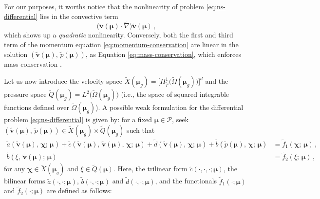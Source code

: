 \documentclass[12pt, a4paper, twoside, openright]{report}
\numberwithin{equation}{chapter}
\theoremstyle{theorem}
\theoremstyle{definition}
\theoremstyle{remark}
\theoremstyle{proposition}
\numberwithin{figure}{chapter}
\newcommand{\wt}[1]{\widetilde{#1}}
\newcommand{\bg}[1]{\boldsymbol{#1}}
\begin{document}
		For our purposes, it worths notice that the nonlinearity of problem \eqref{eq:ns-differential} lies in the convective term
		\begin{equation*}
			\big( \wt{\bg{v}}(\bg{\mu}) \cdot \wt{\nabla} \big) \wt{\bg{v}}(\bg{\mu}) \, ,
		\end{equation*}
		which shows up a \emph{quadratic} nonlinearity. Conversely, both the first and third term of the momentum equation \eqref{eq:momentum-conservation} are linear in the solution $(\wt{\bg{v}}(\bg{\mu}), \, \wt{p}(\bg{\mu}))$, as Equation \eqref{eq:mass-conservation}, which enforces mass conservation \cite{QMN15}.
		
		Let us now introduce the velocity space $\wt{X}(\bg{\mu}_g) = \big[ H^1_{\wt{\Gamma}} \big( \wt{\Omega}(\bg{\mu}_g) \big) \big]^d$ and the pressure space $\wt{Q}(\bg{\mu}_g) = L^2 \big( \wt{\Omega}(\bg{\mu}_g) \big)$ (i.e., the space of squared integrable functions defined over $\wt{\Omega}(\bg{\mu}_g)$). A possible weak formulation for the differential problem \eqref{eq:ns-differential} is given by: for a fixed $\bg{\mu} \in \mathcal{P}$, seek $(\wt{\bg{v}}(\bg{\mu}), \, \wt{p}(\bg{\mu})) \in \wt{X}(\bg{\mu}_g) \times \wt{Q}(\bg{\mu}_g)$ such that
		\begin{subequations}
			\label{eq:ns-weak}
			\begin{align}
				\label{eq:ns-weak-velocity}
				\wt{a}(\wt{\bg{v}}(\bg{\mu}), \, \bg{\chi}; \, \bg{\mu}) + \wt{c}(\wt{\bg{v}}(\bg{\mu}), \, \wt{\bg{v}}(\bg{\mu}), \, \bg{\chi}; \, \bg{\mu}) + \wt{d}(\wt{\bg{v}}(\bg{\mu}), \, \bg{\chi}; \, \bg{\mu}) + \wt{b}(\wt{p}(\bg{\mu}), \, \bg{\chi}; \, \bg{\mu}) & = \wt{f}_1(\bg{\chi}; \, \bg{\mu}) \, , \\
				\label{eq:ns-weak-pressure}
				\wt{b}(\xi, \, \wt{\bg{v}}(\bg{\mu}); \, \bg{\mu}) & = \wt{f}_2(\xi; \, \bg{\mu}) \, ,
			\end{align}
		\end{subequations}
		for any $\bg{\chi} \in \wt{X}(\bg{\mu}_g)$ and $\xi \in \wt{Q}(\bg{\mu})$. Here, the trilinear form $\wt{c}(\cdot, \cdot, \cdot; \bg{\mu})$, the bilinear forms $\wt{a}(\cdot, \cdot; \bg{\mu})$, $\wt{b}(\cdot, \cdot; \bg{\mu})$ and $\wt{d}(\cdot, \cdot; \bg{\mu})$, and the functionals $\wt{f}_1(\cdot; \bg{\mu})$ and $\wt{f}_2(\cdot; \bg{\mu})$ are defined as follows:
\end{document}
